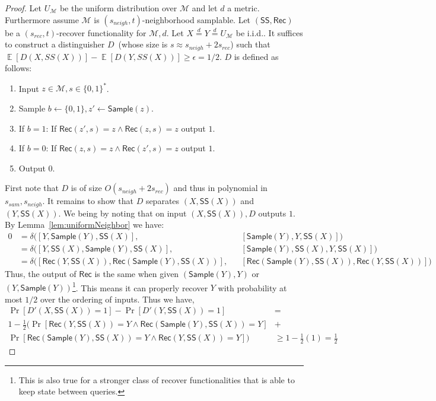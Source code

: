 \documentclass[11pt]{article}
\newcommand{\lemref}[1]{\mbox{Lemma~\ref{#1}}}
\DeclareMathOperator*{\expe}{\mathbb{E}}
\newcommand{\class}[1]{{\ensuremath{\mathsf{#1}}}}
\newcommand{\sketch}{\ensuremath{\class{SS}}\xspace}
\newcommand{\rec}{\ensuremath{\class{Rec}}\xspace}
\newcommand{\sample}{\ensuremath{\class{Sample}}\xspace}
\begin{document}
{\begin{proof}
Let $U_\mathcal{M}$ be the uniform distribution over $\mathcal{M}$ and let $d$ a  metric.  Furthermore assume $\mathcal{M}$ is $(s_{neigh}, t)$-neighborhood samplable.  Let $(\sketch, \rec)$ be a $(s_{rec}, t)$-recover functionality for $\mathcal{M}, d$.  Let $X\overset{d}= Y\overset{d}= U_\mathcal{M}$ be i.i.d..  It suffices to construct a distinguisher $D$~(whose size is $s\approx s_{neigh}+2s_{rec}$) such that $\expe[D(X, SS(X))]- \expe[D(Y, SS(X))]\geq \epsilon = 1/2$.  
$D$ is defined as follows:
\begin{enumerate}
\item Input $z\in\mathcal{M}, s \in\{0, 1\}^*$. 
\item Sample $b\leftarrow \{0,1\}, z'\leftarrow \sample(z)$.
\item If $b=1$:
\subitem If $\rec(z', s) = z\wedge \rec(z, s) = z$ output $1$.
\item If $b=0$:
\subitem If $\rec(z, s) = z \wedge \rec(z', s)=z$ output $1$.
\item Output $0$.
\end{enumerate}
First note that $D$ is of size $O(s_{neigh}+2s_{rec})$ and thus in polynomial in $s_{sam}, s_{neigh}$.  It remains to show that $D$ separates $(X,\sketch(X))$ and $(Y,\sketch(X))$.  We being by noting that on input $(X, \sketch(X)), D$ outputs $1$.
By \lemref{lem:uniformNeighbor} we have:
\begin{align*}
0&=\delta([Y, \sample(Y), \sketch(X)],& &[\sample(Y), Y, \sketch(X)])\\
&=\delta([Y, \sketch(X), \sample(Y), \sketch(X)],& &[\sample(Y), \sketch(X), Y, \sketch(X)])\\
&=\delta([\rec(Y,\sketch(X)), \rec(\sample(Y),\sketch(X))],& &[\rec(\sample(Y), \sketch(X)), \rec(Y, \sketch(X))])
\end{align*}
Thus, the output of $\rec$ is the same when given $(\sample(Y), Y)$ or $(Y, \sample(Y))$\footnote{This is also true for a stronger class of recover functionalities that is able to keep state between queries.}.  This means it can properly recover $Y$ with probability at most $1/2$ over the ordering of inputs.  Thus we have, 
\begin{align*}
\Pr[D'(X, \sketch(X))=1] - \Pr[D'(Y, \sketch(X))=1] &=\\
1 - \frac{1}{2}(\Pr[\rec(Y, \sketch(X)) = Y \wedge \rec(\sample(Y),\sketch(X))=Y]&+\\\Pr[\rec(\sample(Y), \sketch(X)) = Y \wedge \rec(Y, \sketch(X)) = Y])&\geq 
1-\frac{1}{2}\left(1\right) =\frac{1}{2}
\end{align*}


\end{proof}}
\end{document}
